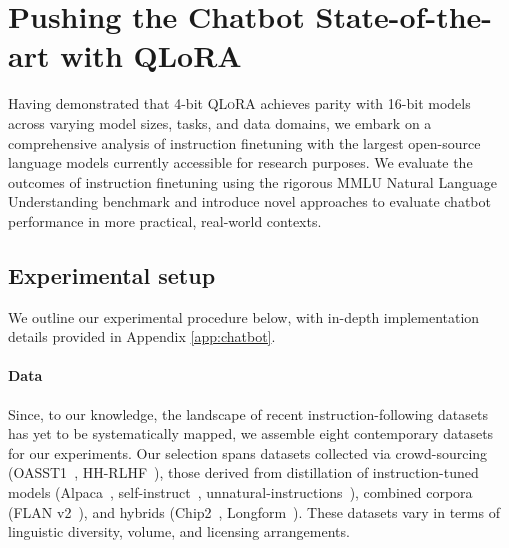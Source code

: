 \section{Pushing the Chatbot State-of-the-art with QLoRA}
\label{sec:pushing}
Having demonstrated that 4-bit \textsc{QLoRA} achieves parity with 16-bit models across varying model sizes, tasks, and data domains, we embark on a comprehensive analysis of instruction finetuning with the largest open-source language models currently accessible for research purposes. We evaluate the outcomes of instruction finetuning using the rigorous MMLU Natural Language Understanding benchmark and introduce novel approaches to evaluate chatbot performance in more practical, real-world contexts.

\subsection{Experimental setup} We outline our experimental procedure below, with in-depth implementation details provided in Appendix \ref{app:chatbot}.

\paragraph{Data} Since, to our knowledge, the landscape of recent instruction-following datasets has yet to be systematically mapped, we assemble eight contemporary datasets for our experiments. Our selection spans datasets collected via crowd-sourcing (OASST1~\citep{kopf2023openassistant}, HH-RLHF~\citep{bai2022training}), those derived from distillation of instruction-tuned models (Alpaca~\citep{alpaca}, self-instruct~\citep{wang2022self}, unnatural-instructions~\citep{honovich2022unnatural}), combined corpora (FLAN v2~\citep{chung2022scaling}), and hybrids (Chip2~\citep{laion2023}, Longform~\citep{koksal2023longform}). These datasets vary in terms of linguistic diversity, volume, and licensing arrangements.

